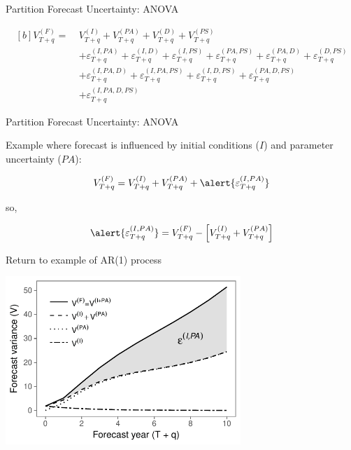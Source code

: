 \documentclass[12pt, compress, aspectratio=1610]{beamer}
\begin{document}
\begin{frame}{%
\protect\hypertarget{partition-forecast-uncertainty-anova-1}{%
Partition Forecast Uncertainty: ANOVA}}

\begin{equation*}
\begin{aligned}[b]
V_{T+q}^{(F)} = \ &V_{T+q}^{(I)} + V_{T+q}^{(PA)} + V_{T+q}^{(D)} + V_{T+q}^{(PS)} \\
&+ \varepsilon_{T+q}^{(I,PA)} + \varepsilon_{T+q}^{(I,D)} + \varepsilon_{T+q}^{(I,PS)} + \varepsilon_{T+q}^{(PA,PS)} + \varepsilon_{T+q}^{(PA,D)} + \varepsilon_{T+q}^{(D,PS)} \\
&+ \varepsilon_{T+q}^{(I,PA,D)} + \varepsilon_{T+q}^{(I,PA,PS)} + \varepsilon_{T+q}^{(I,D,PS)} + \varepsilon_{T+q}^{(PA,D,PS)} \\
&+ \varepsilon_{T+q}^{(I,PA,D,PS)}
\end{aligned}
\end{equation*}

\end{frame}

\begin{frame}{%
\protect\hypertarget{partition-forecast-uncertainty-anova-2}{%
Partition Forecast Uncertainty: ANOVA}}

Example where forecast is influenced by initial conditions (\(I\)) and
parameter uncertainty (\(PA\)):

\begin{equation*}
V^{(F)}_{T+q} = V^{(I)}_{T+q} + V^{(PA)}_{T+q} + \alert{\varepsilon_{T+q}^{(I,PA)}}
\end{equation*}

so,

\begin{equation*}
\alert{\varepsilon_{T+q}^{(I,PA)}} = V^{(F)}_{T+q} - \left[ V^{(I)}_{T+q} + V^{(PA)}_{T+q} \right]
\end{equation*}

\end{frame}

\begin{frame}{%
\protect\hypertarget{return-to-example-of-ar1-process}{%
Return to example of AR(1) process}}

\centering

\includegraphics[height=2.5in]{./figures/example_interaction_effect.pdf}

\end{frame}
\end{document}
